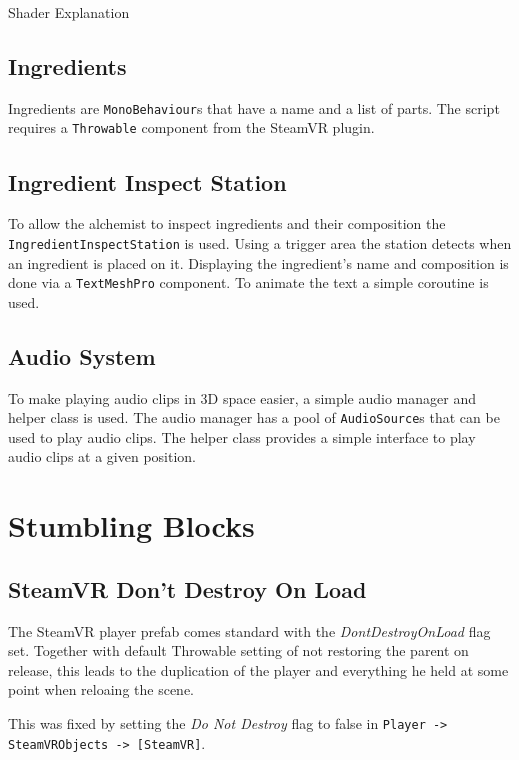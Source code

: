 \documentclass{vgtc}
\begin{document}
Shader Explanation

\subsection{Ingredients}

Ingredients are \texttt{MonoBehaviour}s that have a name and a list of parts. The script requires a \texttt{Throwable}
component from the SteamVR plugin.

\subsection{Ingredient Inspect Station}

To allow the alchemist to inspect ingredients and their composition the \texttt{IngredientInspectStation} is used.
Using a trigger area the station detects when an ingredient is placed on it. Displaying the ingredient's name and
composition is done via a \texttt{TextMeshPro} component. To animate the text a simple coroutine is used.

\subsection{Audio System}

To make playing audio clips in 3D space easier, a simple audio manager and helper class is used. The audio manager
has a pool of \texttt{AudioSource}s that can be used to play audio clips. The helper class provides a simple interface
to play audio clips at a given position.

\section{Stumbling Blocks}

\subsection{SteamVR Don't Destroy On Load}

The SteamVR player prefab comes standard with the \emph{DontDestroyOnLoad} flag set. Together with default Throwable setting
of not restoring the parent on release, this leads to the duplication of the player and everything he held at some point when
reloaing the scene.

This was fixed by setting the \emph{Do Not Destroy} flag to false in \texttt{Player -> SteamVRObjects -> [SteamVR]}.

\end{document}
